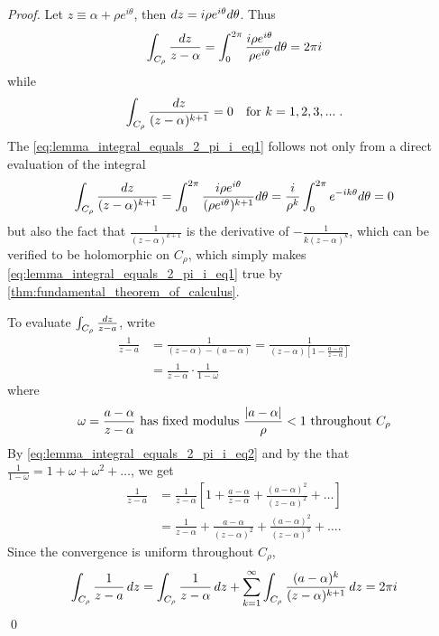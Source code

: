 \documentclass[notoc,notitlepage]{tufte-book}
\begin{document}
\begin{proof}
	Let $z \equiv \alpha + \rho e^{i \theta}$, then $\mathop{}\!d{z} = i \rho e^{i \theta} d \theta$. Thus
	\begin{equation*}
		\int_{C_\rho} \frac{\mathop{}\!d{z}}{z - \alpha} = \int_{0}^{2 \pi} \frac{i \rho e^{i \theta}}{\rho e^{i \theta}} d \theta = 2 \pi i
	\end{equation*}
	while
	\begin{equation}\label{eq:lemma_integral_equals_2_pi_i_eq1}
		\int_{C_\rho} \frac{\mathop{}\!d{z}}{(z - \alpha)^{k + 1}} = 0 \quad \text{for } k = 1, 2, 3, ... \; .
	\end{equation}
	The \cref{eq:lemma_integral_equals_2_pi_i_eq1} follows not only from a direct evaluation of the integral
	\begin{equation*}
		\int_{C_\rho} \frac{\mathop{}\!d{z}}{(z - \alpha)^{k + 1}} = \int_{0}^{2 \pi} \frac{i \rho e^{i \theta}}{(\rho e^{i \theta})^{k + 1}} d \theta = \frac{i}{\rho^k} \int_{0}^{2 \pi} e^{-i k \theta} d \theta = 0
	\end{equation*}
	but also the fact that $\frac{1}{(z - \alpha)^{k + 1}}$ is the derivative of $-\frac{1}{k(z - \alpha)^k}$, which can be verified to be holomorphic on $C_\rho$, which simply makes \cref{eq:lemma_integral_equals_2_pi_i_eq1} true by \cref{thm:fundamental_theorem_of_calculus}.

	To evaluate $\int_{C_\rho} \frac{\mathop{}\!d{z}}{z - a}$, write
	\begin{align*}
		\frac{1}{z - a}
			&= \frac{1}{(z - \alpha) - (a - \alpha)} = \frac{1}{(z - \alpha)[1 - \frac{a - \alpha}{z - \alpha}]} \\
			&= \frac{1}{z - \alpha} \cdot \frac{1}{1 - \omega} 
	\end{align*}
	where
	\begin{equation}\label{eq:lemma_integral_equals_2_pi_i_eq2}
		\omega = \frac{a - \alpha}{z - \alpha} \text{ has fixed modulus } \frac{\left|a - \alpha\right|}{\rho} < 1 \text{ throughout } C_\rho 
	\end{equation}
	By \cref{eq:lemma_integral_equals_2_pi_i_eq2} and by the  that $\frac{1}{1 - \omega} = 1 + \omega + \omega^2 + \hdots$, we get
	\begin{align*}
		\frac{1}{z - a}
			&= \frac{1}{z - \alpha} \left[ 1 + \frac{a - \alpha}{z - \alpha} + \frac{(a - \alpha)^2}{(z - \alpha)^2} + \hdots \right] \\
			&= \frac{1}{z - \alpha} + \frac{a - \alpha}{(z - \alpha)^2} + \frac{(a - \alpha)^2}{(z - \alpha)^3} + \hdots . 
	\end{align*}
	Since the convergence is uniform throughout $C_\rho$,
	\begin{equation*}
		\int_{C_\rho} \frac{1}{z - a} \mathop{}\!d{z}
			= \int_{C_\rho} \frac{1}{z - \alpha} \mathop{}\!d{z} + \sum_{k=1}^{\infty} \int_{C_\rho} \frac{(a - \alpha)^k}{(z - \alpha)^{k + 1}} \mathop{}\!d{z} = 2 \pi i
	\end{equation*}\qed
\end{proof}
\end{document}
